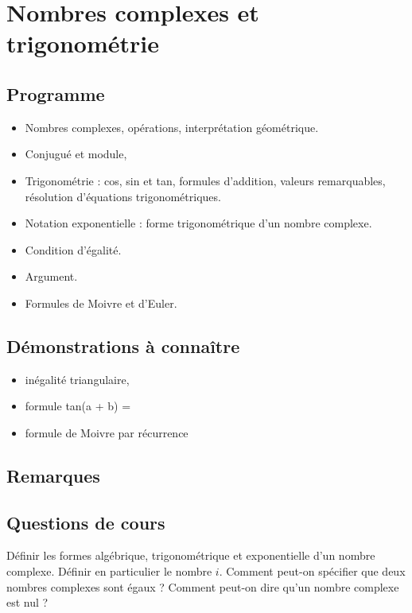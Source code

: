  \chapter{Nombres complexes et trigonométrie}
 
\section{Programme}
	\begin{itemize}
	\item Nombres complexes, opérations, interprétation géométrique.
 	\item Conjugué et module,
 	\item Trigonométrie : cos, sin et tan, formules d’addition, valeurs remarquables, résolution d’équations trigonométriques.
 	\item Notation exponentielle : forme trigonométrique d’un nombre complexe.
 	\item  Condition d’égalité. 
 	\item Argument.
 	\item  Formules de Moivre et d’Euler.
 \end{itemize}

\section{Démonstrations à connaître}
	\begin{itemize}
		\item inégalité triangulaire,
		\item formule tan(a + b) =
		\item formule de Moivre par récurrence
\end{itemize}



\section{Remarques}

	
	
	


\section{Questions de cours}	


\begin{exercise}[subtitle=Formes d'un nombre complexe, extype=cours]
	\begin{tasks} 
		\task Définir les formes algébrique, trigonométrique et exponentielle d'un nombre complexe.
		\task Définir en particulier le nombre $i$.
		\task Comment peut-on spécifier que deux nombres complexes sont égaux ?
		\task Comment peut-on dire qu'un nombre complexe est nul ?
	\end{tasks}
\end{exercise}


